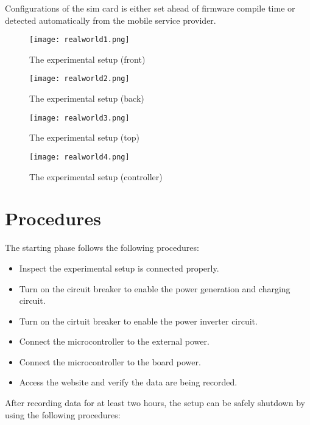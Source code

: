 \documentclass[../thesis.tex]{subfiles}
\begin{document}
Configurations of the sim card is either set ahead of firmware compile time or detected automatically from the mobile service provider.

\begin{figure}[!ht]
	\centering
	\texttt{[image: realworld1.png]}
	\caption{The experimental setup (front)}
	\label{fig:realworld1}
\end{figure}

\begin{figure}[!ht]
	\centering
	\texttt{[image: realworld2.png]}
	\caption{The experimental setup (back)}
	\label{fig:realworld2}
\end{figure}

\begin{figure}[!ht]
	\centering
	\texttt{[image: realworld3.png]}
	\caption{The experimental setup (top)}
	\label{fig:realworld3}
\end{figure}

\begin{figure}[!ht]
	\centering
	\texttt{[image: realworld4.png]}
	\caption{The experimental setup (controller)}
	\label{fig:realworld4}
\end{figure}

\section{Procedures} %

The starting phase follows the following procedures:

\begin{itemize}
	\item Inspect the experimental setup is connected properly.
	\item Turn on the circuit breaker to enable the power generation and charging circuit. 
	\item Turn on the cirtuit breaker to enable the power inverter circuit. 
	\item Connect the microcontroller to the external power.
	\item Connect the microcontroller to the board power.
	\item Access the website and verify the data are being recorded.
\end{itemize}

After recording data for at least two hours, the setup can be safely shutdown by using the following procedures:
\end{document}
